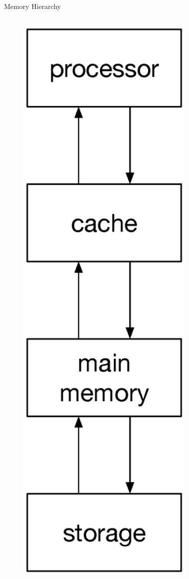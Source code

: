 \begin{frame}{Memory Hierarchy}
\begin{columns}
\begin{column}{0.2\textwidth}
\includegraphics[width=0.8\textwidth]{./figures/memory_hierarchy}
\end{column}
\end{columns}
\end{frame}


